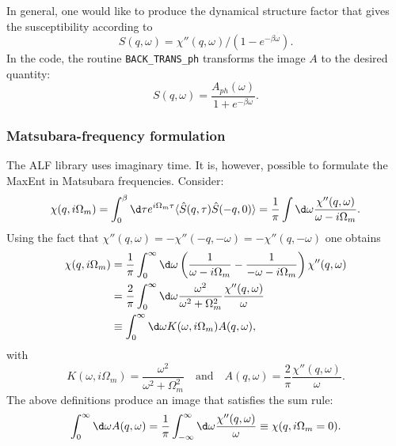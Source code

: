 In general,  one would like to produce the  dynamical structure factor that gives the susceptibility according to
\begin{equation}
 S(q,\omega)  = \chi''(q,\omega)/\left( 1 - e^{-\beta  \omega} \right). 
\end{equation}
In the code, the routine \texttt{BACK\_TRANS\_ph} transforms the image $A$ to the desired quantity:
\begin{equation}
	S(q,\omega) = \frac{A_{ph}(\omega)}{1 + e^{-\beta \omega} } .
\end{equation}
\subsubsection*{Matsubara-frequency formulation}
The ALF  library uses  imaginary time. It is, however, possible to formulate the MaxEnt in  Matsubara frequencies.
Consider:
\begin{equation}
  \chi(q,i\Omega_m) = \int_0^{\beta} \d \tau  e^{i \Omega_m \tau}
	\langle \hat{S}(q,\tau) \hat{S}(-q,0) \rangle  = \frac{1}{\pi}
   \int \d \omega  \frac{\chi''(q,\omega)}{ \omega - i \Omega_m }.
\end{equation}
Using the fact that $\chi''(q,\omega) = -\chi''(-q,-\omega) = -\chi''(q,-\omega)$ one obtains
\begin{align}
  \chi(q,i\Omega_m) &= 
	\frac{1}{\pi}
   \int_0^{\infty} \d \omega \left(\frac{1}{ \omega - i \Omega_m } - \frac{1}{ -\omega - i \Omega_m } \right)
         \chi''(q,\omega) \nonumber \\ 
    &= \frac{2}{\pi} \int_0^{\infty} \d \omega \frac{\omega^2}{ \omega^2  + \Omega_m^2 } 
  \frac{\chi''(q,\omega)}{\omega} \\
    &\equiv \int_0^{\infty} \d \omega K(\omega,i\Omega_m) A(q,\omega), \nonumber
\end{align}
with
\begin{equation}
   K(\omega,i\Omega_m) = \frac{\omega^2}{ \omega^2  + \Omega_m^2 } \quad \text{and} \quad
A(q,\omega) =  \frac{2}{\pi}   \frac{\chi''(q,\omega)}{\omega} .
\end{equation}
The above definitions produce an image that satisfies the sum rule:
\begin{equation}
\int_0^{\infty} \d \omega A(q,\omega) =  \frac{1}{\pi}  \int_{-\infty}^{\infty} \d \omega 
   \frac{\chi''(q,\omega)}{\omega}   \equiv \chi(q,i\Omega_m=0) .
\end{equation}

